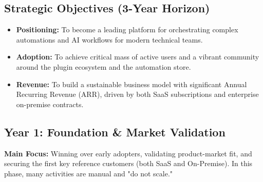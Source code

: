 \documentclass[11pt, a4paper, oneside]{article}
\begin{document}
\subsection{Strategic Objectives (3-Year Horizon)}
\begin{itemize}
    \item \textbf{Positioning:} To become a leading platform for orchestrating complex automations and AI workflows for modern technical teams.
    \item \textbf{Adoption:} To achieve critical mass of active users and a vibrant community around the plugin ecosystem and the automation store.
    \item \textbf{Revenue:} To build a sustainable business model with significant Annual Recurring Revenue (ARR), driven by both SaaS subscriptions and enterprise on-premise contracts.
\end{itemize}

\subsection{Year 1: Foundation \& Market Validation}
\textbf{Main Focus:} Winning over early adopters, validating product-market fit, and securing the first key reference customers (both SaaS and On-Premise). In this phase, many activities are manual and "do not scale."
\end{document}
